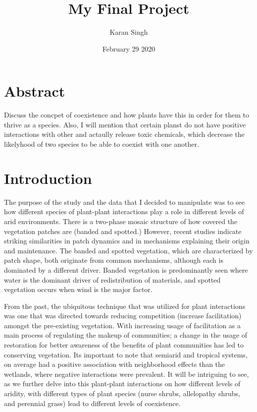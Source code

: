 \documentclass[letterpaper]{article}
\title{My Final Project}
\author{Karan Singh}
\date{February 29 2020}
\begin{document}
\maketitle
\section*{Abstract}
Discuss the concpet of coexistence and how plants have this in order for them to thrive as a species. Also, I will mention that certain planst do not have positive interactions with other and actaully release toxic chemicals, which decrease the likelyhood of two species to be able to coexist with one another.
\newpage
\tableofcontents


\newpage
\section{Introduction}
The purpose of the study and the data that I decided to manipulate was to see how different species of plant-plant interactions play a role in different levels of arid environments. There is a two-phase mosaic structure of how covered the vegetation patches are (banded and spotted.) However, recent studies indicate striking similarities in patch dynamics and in mechanisms explaining their origin and maintenance. The banded and spotted vegetation, which are characterized by patch shape, both originate from common mechanisms, although each is dominated by a different driver. Banded vegetation is predominantly seen where water is the dominant driver of redistribution of materials, and spotted vegetation occurs when wind is the major factor.

From the past, the ubiquitous technique that was utilized for plant interactions was one that was directed towards reducing competition (increase facilitation) amongst the pre-existing vegetation. With increasing usage of facilitation as a main process of regulating the makeup of communities; a change in the usage of restoration for better awareness of the benefits of plant communities has led to conserving vegetation. Its important to note that semiarid and tropical systems, on average had a positive association with neighborhood effects than the wetlands, where negative interactions were prevalent. It will be intriguing to see, as we further delve into this plant-plant interactions on how different levels of aridity, with different types of plant species (nurse shrubs, allelopathy shrubs, and perennial grass) lead to different levels of coexistence.
\end{document}
